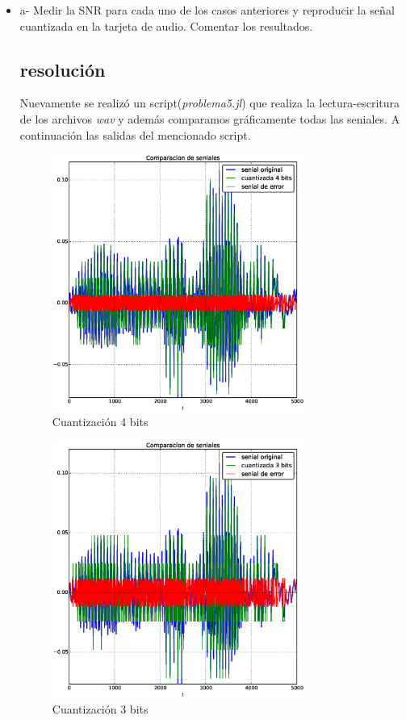 \documentclass[10pt]{article}
\begin{document}
\begin{itemize}
    \item a- Medir la SNR para cada uno de los casos anteriores y reproducir la señal cuantizada en la tarjeta de audio. Comentar los resultados.


\subsection{resolución}
Nuevamente se realizó un script(\textit{problema5.jl}) que realiza la lectura-escritura de los archivos \textit{wav}
y además comparamos gráficamente todas las seniales. A continuación las salidas del mencionado script.


\begin{figure}[H]
   \centering
   \includegraphics[width=0.78\textwidth]{./Images/senialesv_voz_4_bits.eps}
   \caption{Cuantización 4 bits}\label{fig:qv:4}     
\end{figure}


\begin{figure}[H]
   \centering
   \includegraphics[width=0.78\textwidth]{./Images/senialesv_voz_3_bits.eps}
   \caption{Cuantización 3 bits}\label{fig:qv:3}     
\end{figure}



\end{itemize}
\end{document}
